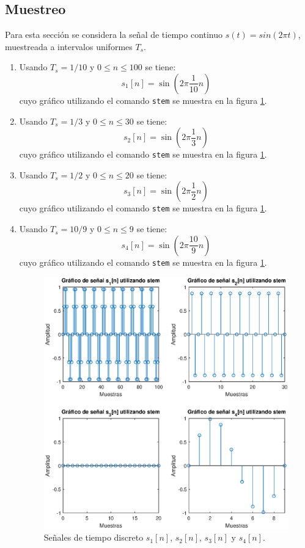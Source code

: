 \subsection{Muestreo}

Para esta sección se considera la señal de tiempo continuo $s(t) = sin(2\pi t)$, muestreada a intervalos uniformes $T_s$.

\begin{enumerate}
    
    \item Usando $T_s = 1/10$ y $ 0 \leq n \leq 100 $ se tiene:
    $$s_1[n] = \sin\left(2\pi \dfrac{1}{10}n\right)$$
    cuyo gráfico utilizando el comando \texttt{stem} se muestra en la figura \ref{fig:Ip2}.
    
    \item Usando $T_s = 1/3$ y $ 0 \leq n \leq 30 $ se tiene:
    $$s_2[n] = \sin\left(2\pi \dfrac{1}{3}n\right)$$
    cuyo gráfico utilizando el comando \texttt{stem} se muestra en la figura \ref{fig:Ip2}.
    
    \item Usando $T_s = 1/2$ y $ 0 \leq n \leq 20 $ se tiene:
    $$s_3[n] = \sin\left(2\pi \dfrac{1}{2}n\right)$$
    cuyo gráfico utilizando el comando \texttt{stem} se muestra en la figura \ref{fig:Ip2}.
    
    \item Usando $T_s = 10/9$ y $ 0 \leq n \leq 9 $ se tiene:
    $$s_4[n] = \sin\left(2\pi \dfrac{10}{9}n\right)$$
    cuyo gráfico utilizando el comando \texttt{stem} se muestra en la figura \ref{fig:Ip2}.
    
    \begin{figure}[H]
    \centering
    \includegraphics[scale = 0.7]{Imagenes/muestreo_sennales.eps}
    \caption{Señales de tiempo discreto $s_1[n]$, $s_2[n]$, $s_3[n]$ y $s_4[n]$.}
    \label{fig:Ip2}
    \end{figure}
    

\end{enumerate}
